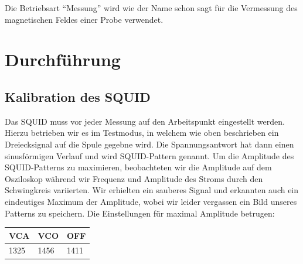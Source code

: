 \documentclass[12pt]{article}
\begin{document}
Die Betriebsart "`Messung"' wird wie der Name schon sagt für die Vermessung des magnetischen Feldes einer Probe verwendet.

\section{Durchführung}
\subsection{Kalibration des SQUID}
Das SQUID muss vor jeder Messung auf den Arbeitspunkt eingestellt werden. Hierzu betrieben wir es im Testmodus, in welchem wie oben beschrieben ein Dreiecksignal auf die Spule gegebne wird. Die Spannungsantwort hat dann einen sinusförmigen Verlauf und wird SQUID-Pattern genannt. Um die Amplitude des SQUID-Patterns zu maximieren, beobachteten wir die Amplitude auf dem Osziloskop während wir Frequenz und Amplitude des Stroms durch den Schwingkreis variierten. Wir erhielten ein sauberes Signal und erkannten auch ein eindeutiges Maximum der Amplitude, wobei wir leider vergassen ein Bild unseres Patterns zu speichern. Die Einstellungen für maximal Amplitude betrugen:
\begin{center}
\begin{tabular}{|l|l|l|}
\hline
VCA & VCO & OFF \\ 
\hline
1325 & 1456 & 1411 \\ 
\hline
\end{tabular}
\end{center}
\end{document}
